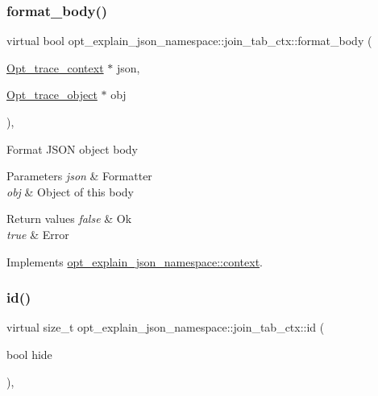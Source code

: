 \subsubsection{\texorpdfstring{format\+\_\+body()}{format\_body()}}
{\footnotesize\ttfamily virtual bool opt\+\_\+explain\+\_\+json\+\_\+namespace\+::join\+\_\+tab\+\_\+ctx\+::format\+\_\+body (\begin{DoxyParamCaption}\item[{\mbox{\hyperlink{classOpt__trace__context}{Opt\+\_\+trace\+\_\+context}} $\ast$}]{json,  }\item[{\mbox{\hyperlink{classOpt__trace__object}{Opt\+\_\+trace\+\_\+object}} $\ast$}]{obj }\end{DoxyParamCaption})\hspace{0.3cm}{\ttfamily [inline]}, {\ttfamily [virtual]}}

Format J\+S\+ON object body


\begin{DoxyParams}{Parameters}
{\em json} & Formatter \\
\hline
{\em obj} & Object of this body\\
\hline
\end{DoxyParams}

\begin{DoxyRetVals}{Return values}
{\em false} & Ok \\
\hline
{\em true} & Error \\
\hline
\end{DoxyRetVals}


Implements \mbox{\hyperlink{classopt__explain__json__namespace_1_1context}{opt\+\_\+explain\+\_\+json\+\_\+namespace\+::context}}.

\mbox{\label{classopt__explain__json__namespace_1_1join__tab__ctx_a294e12d9416adb645ab30841bddda4e0}} 
\subsubsection{\texorpdfstring{id()}{id()}}
{\footnotesize\ttfamily virtual size\+\_\+t opt\+\_\+explain\+\_\+json\+\_\+namespace\+::join\+\_\+tab\+\_\+ctx\+::id (\begin{DoxyParamCaption}\item[{bool}]{hide }\end{DoxyParamCaption})\hspace{0.3cm}{\ttfamily [inline]}, {\ttfamily [virtual]}}

